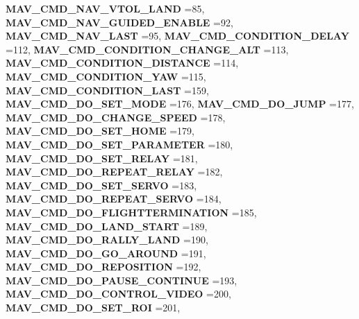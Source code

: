 \begin{DoxyCompactItemize}
\newline
\textbf{ M\+A\+V\+\_\+\+C\+M\+D\+\_\+\+N\+A\+V\+\_\+\+V\+T\+O\+L\+\_\+\+L\+A\+ND} =85, 
\textbf{ M\+A\+V\+\_\+\+C\+M\+D\+\_\+\+N\+A\+V\+\_\+\+G\+U\+I\+D\+E\+D\+\_\+\+E\+N\+A\+B\+LE} =92, 
\textbf{ M\+A\+V\+\_\+\+C\+M\+D\+\_\+\+N\+A\+V\+\_\+\+L\+A\+ST} =95, 
\textbf{ M\+A\+V\+\_\+\+C\+M\+D\+\_\+\+C\+O\+N\+D\+I\+T\+I\+O\+N\+\_\+\+D\+E\+L\+AY} =112, 
\newline
\textbf{ M\+A\+V\+\_\+\+C\+M\+D\+\_\+\+C\+O\+N\+D\+I\+T\+I\+O\+N\+\_\+\+C\+H\+A\+N\+G\+E\+\_\+\+A\+LT} =113, 
\textbf{ M\+A\+V\+\_\+\+C\+M\+D\+\_\+\+C\+O\+N\+D\+I\+T\+I\+O\+N\+\_\+\+D\+I\+S\+T\+A\+N\+CE} =114, 
\textbf{ M\+A\+V\+\_\+\+C\+M\+D\+\_\+\+C\+O\+N\+D\+I\+T\+I\+O\+N\+\_\+\+Y\+AW} =115, 
\textbf{ M\+A\+V\+\_\+\+C\+M\+D\+\_\+\+C\+O\+N\+D\+I\+T\+I\+O\+N\+\_\+\+L\+A\+ST} =159, 
\newline
\textbf{ M\+A\+V\+\_\+\+C\+M\+D\+\_\+\+D\+O\+\_\+\+S\+E\+T\+\_\+\+M\+O\+DE} =176, 
\textbf{ M\+A\+V\+\_\+\+C\+M\+D\+\_\+\+D\+O\+\_\+\+J\+U\+MP} =177, 
\textbf{ M\+A\+V\+\_\+\+C\+M\+D\+\_\+\+D\+O\+\_\+\+C\+H\+A\+N\+G\+E\+\_\+\+S\+P\+E\+ED} =178, 
\textbf{ M\+A\+V\+\_\+\+C\+M\+D\+\_\+\+D\+O\+\_\+\+S\+E\+T\+\_\+\+H\+O\+ME} =179, 
\newline
\textbf{ M\+A\+V\+\_\+\+C\+M\+D\+\_\+\+D\+O\+\_\+\+S\+E\+T\+\_\+\+P\+A\+R\+A\+M\+E\+T\+ER} =180, 
\textbf{ M\+A\+V\+\_\+\+C\+M\+D\+\_\+\+D\+O\+\_\+\+S\+E\+T\+\_\+\+R\+E\+L\+AY} =181, 
\textbf{ M\+A\+V\+\_\+\+C\+M\+D\+\_\+\+D\+O\+\_\+\+R\+E\+P\+E\+A\+T\+\_\+\+R\+E\+L\+AY} =182, 
\textbf{ M\+A\+V\+\_\+\+C\+M\+D\+\_\+\+D\+O\+\_\+\+S\+E\+T\+\_\+\+S\+E\+R\+VO} =183, 
\newline
\textbf{ M\+A\+V\+\_\+\+C\+M\+D\+\_\+\+D\+O\+\_\+\+R\+E\+P\+E\+A\+T\+\_\+\+S\+E\+R\+VO} =184, 
\textbf{ M\+A\+V\+\_\+\+C\+M\+D\+\_\+\+D\+O\+\_\+\+F\+L\+I\+G\+H\+T\+T\+E\+R\+M\+I\+N\+A\+T\+I\+ON} =185, 
\textbf{ M\+A\+V\+\_\+\+C\+M\+D\+\_\+\+D\+O\+\_\+\+L\+A\+N\+D\+\_\+\+S\+T\+A\+RT} =189, 
\textbf{ M\+A\+V\+\_\+\+C\+M\+D\+\_\+\+D\+O\+\_\+\+R\+A\+L\+L\+Y\+\_\+\+L\+A\+ND} =190, 
\newline
\textbf{ M\+A\+V\+\_\+\+C\+M\+D\+\_\+\+D\+O\+\_\+\+G\+O\+\_\+\+A\+R\+O\+U\+ND} =191, 
\textbf{ M\+A\+V\+\_\+\+C\+M\+D\+\_\+\+D\+O\+\_\+\+R\+E\+P\+O\+S\+I\+T\+I\+ON} =192, 
\textbf{ M\+A\+V\+\_\+\+C\+M\+D\+\_\+\+D\+O\+\_\+\+P\+A\+U\+S\+E\+\_\+\+C\+O\+N\+T\+I\+N\+UE} =193, 
\textbf{ M\+A\+V\+\_\+\+C\+M\+D\+\_\+\+D\+O\+\_\+\+C\+O\+N\+T\+R\+O\+L\+\_\+\+V\+I\+D\+EO} =200, 
\newline
\textbf{ M\+A\+V\+\_\+\+C\+M\+D\+\_\+\+D\+O\+\_\+\+S\+E\+T\+\_\+\+R\+OI} =201, 

\end{DoxyCompactItemize}
